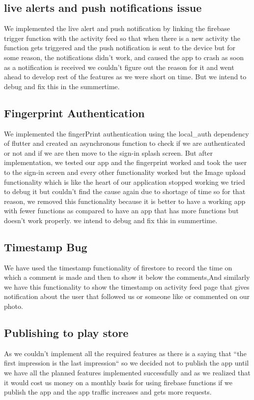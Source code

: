 \subsection{live alerts and push notifications issue}
We implemented the live alert and push notification by linking the firebase trigger function with the activity feed so that when there is a new activity the function gets triggered and the push notification is sent to the device but for some reason, the notifications didn't work, and caused the app to crash as soon as a notification is received we couldn't figure out the reason for it and went ahead to develop rest of the features as we were short on time. But we intend to debug and fix this in the summertime.
\subsection{Fingerprint Authentication}
We implemented the fingerPrint authentication using the local\_auth dependency of flutter and created an asynchronous function to check if we are authenticated or not and if we are then move to the sign-in splash screen. But after implementation, we tested our app and the fingerprint worked and took the user to the sign-in screen and every other functionality worked but the Image upload functionality which is like the heart of our application stopped working we tried to debug it but couldn't find the cause again due to shortage of time so for that reason, we removed this functionality because it is better to have a working app with fewer functions as compared to have an app that has more functions but doesn't work properly. we intend to debug and fix this in summertime.
\subsection{Timestamp Bug}
We have used the timestamp functionality of firestore to record the time on which a comment is made and then to show it below the comments,And similarly we have this functionality to show the timestamp on activity feed page that gives notification about the user that followed us or someone like or commented on our photo.

\subsection{Publishing to play store}
As we couldn't implement all the required features as there is a saying that ``the first impression is the last impression`` so we decided not to publish the app until we have all the planned features implemented successfully and as we realized that it would cost us money on a monthly basis for using firebase functions if we publish the app and the app traffic increases and gets more requests.
